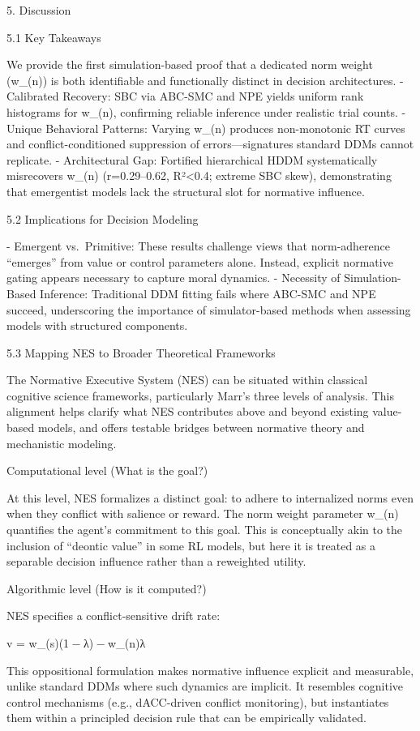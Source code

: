 5. Discussion

5.1 Key Takeaways

We provide the first simulation-based proof that a dedicated norm weight
(w_(n)) is both identifiable and functionally distinct in decision
architectures.
- Calibrated Recovery: SBC via ABC-SMC and NPE yields uniform rank
histograms for w_(n), confirming reliable inference under realistic
trial counts.
- Unique Behavioral Patterns: Varying w_(n) produces non-monotonic RT
curves and conflict-conditioned suppression of errors—signatures
standard DDMs cannot replicate.
- Architectural Gap: Fortified hierarchical HDDM systematically
misrecovers w_(n) (r=0.29–0.62, R²<0.4; extreme SBC skew), demonstrating
that emergentist models lack the structural slot for normative
influence.

5.2 Implications for Decision Modeling

- Emergent vs. Primitive: These results challenge views that
  norm-adherence “emerges” from value or control parameters alone.
  Instead, explicit normative gating appears necessary to capture moral
  dynamics.
- Necessity of Simulation-Based Inference: Traditional DDM fitting fails
  where ABC-SMC and NPE succeed, underscoring the importance of
  simulator-based methods when assessing models with structured
  components.

5.3 Mapping NES to Broader Theoretical Frameworks

The Normative Executive System (NES) can be situated within classical
cognitive science frameworks, particularly Marr’s three levels of
analysis. This alignment helps clarify what NES contributes above and
beyond existing value-based models, and offers testable bridges between
normative theory and mechanistic modeling.

Computational level (What is the goal?)

At this level, NES formalizes a distinct goal: to adhere to internalized
norms even when they conflict with salience or reward. The norm weight
parameter w_(n) quantifies the agent’s commitment to this goal. This is
conceptually akin to the inclusion of “deontic value” in some RL models,
but here it is treated as a separable decision influence rather than a
reweighted utility.

Algorithmic level (How is it computed?)

NES specifies a conflict-sensitive drift rate:

v = w_(s)(1 − λ) − w_(n)λ

This oppositional formulation makes normative influence explicit and
measurable, unlike standard DDMs where such dynamics are implicit. It
resembles cognitive control mechanisms (e.g., dACC-driven conflict
monitoring), but instantiates them within a principled decision rule
that can be empirically validated.

